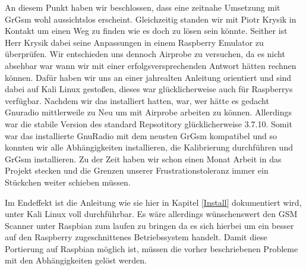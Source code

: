 An diesem Punkt haben wir beschlossen, dass eine zeitnahe Umsetzung mit GrGsm wohl aussichtslos erscheint. Gleichzeitig standen wir mit Piotr Krysik in Kontakt um einen Weg zu finden wie es doch zu lösen sein könnte. Seither ist Herr Krysik dabei seine Anpassungen in einem Raspberry Emulator zu überprüfen. Wir entschieden uns dennoch Airprobe zu versuchen, da es nicht absehbar war wann wir mit einer erfolgsversprechenden Antwort hätten rechnen können. Dafür haben wir uns an einer jahrealten Anleitung orientiert und sind dabei auf Kali Linux gestoßen, dieses war glücklicherweise auch für Raspberrys verfügbar. Nachdem wir das installiert hatten, war, wer hätte es gedacht Gnuradio mittlerweile zu Neu um mit Airprobe arbeiten zu können. Allerdings war die stabile Version des standard Repsotitory glücklicherweise 3.7.10. Somit war das installierte GnuRadio mit dem neusten GrGsm kompatibel und so konnten wir alle Abhängigkeiten installieren, die Kalibrierung durchführen und GrGsm installieren. Zu der Zeit haben wir schon einen Monat Arbeit in das Projekt stecken und die Grenzen unserer Frustrationstoleranz immer ein Stückchen weiter schieben müssen.

Im Endeffekt ist die Anleitung wie sie hier in Kapitel \ref{Install} dokumentiert wird, unter Kali Linux voll durchführbar. Es wäre allerdings wünschenswert den GSM Scanner unter Raspbian zum laufen zu bringen da es sich hierbei um ein besser auf den Raspberry zugeschnittenes Betriebssystem handelt. 
Damit diese Portierung auf Raspbian möglich ist, müssen die vorher beschriebenen Probleme mit den Abhängigkeiten gelöst werden. 
